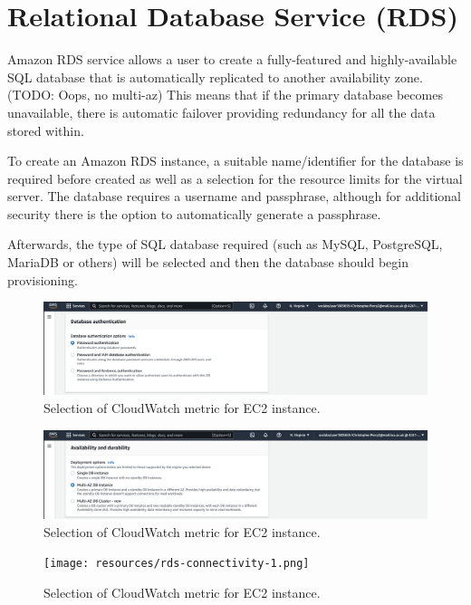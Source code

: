 \chapter{Relational Database Service (RDS)}\label{ch:relational-database-service}
Amazon RDS service allows a user to create a fully-featured and highly-available SQL database that is automatically
replicated to another availability zone. (TODO: Oops, no multi-az) This means that if the primary database becomes
unavailable, there is automatic failover providing redundancy for all the data stored within.

To create an Amazon RDS instance, a suitable name/identifier for the database is required before created as well as a
selection for the resource limits for the virtual server.
The database requires a username and passphrase, although for additional security there is the option to automatically
generate a passphrase.

Afterwards, the type of SQL database required (such as MySQL, PostgreSQL, MariaDB or others) will be selected and then
the database should begin provisioning.

\begin{figure}[!htbp]
    \centering
    \includegraphics[width=\textwidth]{resources/rds/rds-authentication.png}
    \caption{Selection of CloudWatch metric for EC2 instance.}
    \label{fig:rds-auth}
\end{figure}

\begin{figure}[!htbp]
    \centering
    \includegraphics[width=\textwidth]{resources/rds/rds-availability-durability.png}
    \caption{Selection of CloudWatch metric for EC2 instance.}
    \label{fig:rds-avail}
\end{figure}

\begin{figure}[!htbp]
    \centering
    \texttt{[image: resources/rds-connectivity-1.png]}
    \caption{Selection of CloudWatch metric for EC2 instance.}
    \label{fig:rds-connect}
\end{figure}

